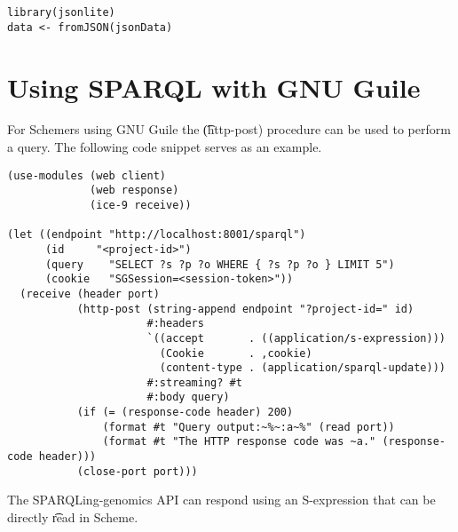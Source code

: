 \begin{siderules}
\begin{verbatim}
library(jsonlite)
data <- fromJSON(jsonData)
\end{verbatim}
\end{siderules}

\section{Using SPARQL with GNU Guile}
\label{sec:sparql-with-guile}

  For Schemers using GNU Guile the \t{(http-post)} procedure can be used
  to perform a query.  The following code snippet serves as an example.

\begin{siderules}
\begin{verbatim}
(use-modules (web client)
             (web response)
             (ice-9 receive))

(let ((endpoint "http://localhost:8001/sparql")
      (id     "<project-id>")
      (query    "SELECT ?s ?p ?o WHERE { ?s ?p ?o } LIMIT 5")
      (cookie   "SGSession=<session-token>"))
  (receive (header port)
           (http-post (string-append endpoint "?project-id=" id)
                      #:headers
                      `((accept       . ((application/s-expression)))
                        (Cookie       . ,cookie)
                        (content-type . (application/sparql-update)))
                      #:streaming? #t
                      #:body query)
           (if (= (response-code header) 200)
               (format #t "Query output:~%~:a~%" (read port))
               (format #t "The HTTP response code was ~a." (response-code header)))
           (close-port port)))
\end{verbatim}
\end{siderules}

  The SPARQLing-genomics API can respond using an S-expression that can be directly
  \t{read} in Scheme.

